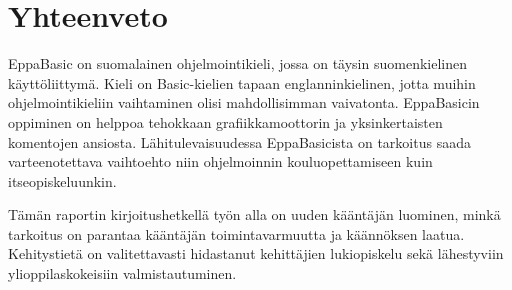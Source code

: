 \section{Yhteenveto}

EppaBasic on suomalainen ohjelmointikieli,
jossa on täysin suomenkielinen käyttöliittymä.
Kieli on Basic-kielien tapaan englanninkielinen,
jotta muihin ohjelmointikieliin vaihtaminen
olisi mahdollisimman vaivatonta.
EppaBasicin oppiminen on helppoa
tehokkaan grafiikkamoottorin ja
yksinkertaisten komentojen ansiosta.
Lähitulevaisuudessa EppaBasicista on tarkoitus
saada varteenotettava vaihtoehto niin ohjelmoinnin
kouluopettamiseen kuin itseopiskeluunkin.

Tämän raportin kirjoitushetkellä työn alla
on uuden kääntäjän luominen,
minkä tarkoitus on parantaa kääntäjän
toimintavarmuutta ja käännöksen laatua.
Kehitystietä on valitettavasti hidastanut kehittäjien
lukiopiskelu sekä lähestyviin ylioppilaskokeisiin
valmistautuminen.